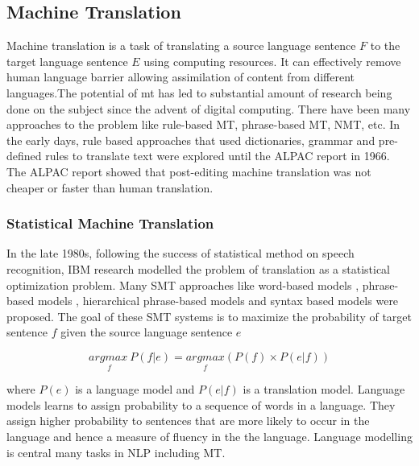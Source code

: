 %

%
%
%

\subsection{Machine Translation}
Machine translation is a task of translating a source language sentence $F$ to the target language sentence $E$ using computing resources. It can effectively remove human language barrier allowing assimilation of content from different languages.The potential of mt has led to substantial amount of research being done on the subject since the advent of digital computing. There have been many approaches to the problem like rule-based MT, phrase-based MT, NMT, etc. In the early days, rule based approaches that used dictionaries, grammar and pre-defined rules to translate text were explored until the ALPAC report in 1966. The ALPAC report showed that post-editing machine translation was not cheaper or faster than human translation. 

\subsubsection{Statistical Machine Translation}

In the late 1980s, following the success of statistical method on speech recognition, IBM research \citep{brown1993mathematics} modelled the problem of translation as a statistical optimization problem. Many SMT approaches like word-based models \citep{brown1993mathematics}, phrase-based models \citep{koehn2003statistical,marcu2002phrase}, hierarchical phrase-based  models \citep{chiang2007hierarchical} and syntax based models \cite{galley2004s,galley2006scalable} were proposed. The goal of these SMT systems is to maximize the probability of target sentence $f$ given the source language sentence $e$

\[ \underset{f}{argmax \  } P(f|e) = \underset{f}{arg max } (P(f) \times P(e|f)) \]

where $P(e)$ is a language model and $P(e|f)$ is a translation model. Language models learns to assign probability to a sequence of words in a language. They assign higher probability to sentences that are more likely to occur in the language and hence a measure of fluency in the the language. Language modelling is central many tasks in NLP including MT.  


